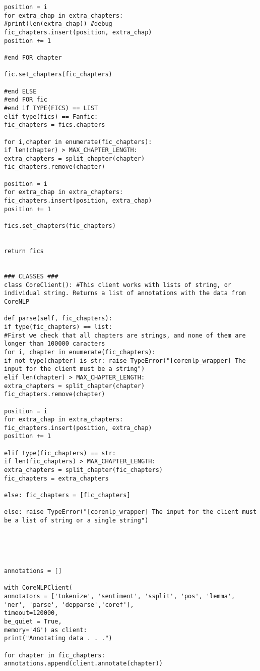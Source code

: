 \documentclass{pre-tfg}
\begin{document}
\begin{lstlisting}[style=consola]
position = i
for extra_chap in extra_chapters:
#print(len(extra_chap)) #debug
fic_chapters.insert(position, extra_chap)
position += 1

#end FOR chapter

fic.set_chapters(fic_chapters)

#end ELSE
#end FOR fic
#end if TYPE(FICS) == LIST
elif type(fics) == Fanfic:
fic_chapters = fics.chapters

for i,chapter in enumerate(fic_chapters):
if len(chapter) > MAX_CHAPTER_LENGTH:
extra_chapters = split_chapter(chapter)
fic_chapters.remove(chapter)

position = i
for extra_chap in extra_chapters:
fic_chapters.insert(position, extra_chap)
position += 1

fics.set_chapters(fic_chapters)


return fics


### CLASSES ###
class CoreClient(): #This client works with lists of string, or individual string. Returns a list of annotations with the data from CoreNLP

def parse(self, fic_chapters):
if type(fic_chapters) == list:
#First we check that all chapters are strings, and none of them are longer than 100000 caracters
for i, chapter in enumerate(fic_chapters):
if not type(chapter) is str: raise TypeError("[corenlp_wrapper] The input for the client must be a string")
elif len(chapter) > MAX_CHAPTER_LENGTH: 
extra_chapters = split_chapter(chapter)
fic_chapters.remove(chapter)

position = i
for extra_chap in extra_chapters:
fic_chapters.insert(position, extra_chap)
position += 1

elif type(fic_chapters) == str:
if len(fic_chapters) > MAX_CHAPTER_LENGTH:
extra_chapters = split_chapter(fic_chapters)
fic_chapters = extra_chapters

else: fic_chapters = [fic_chapters]

else: raise TypeError("[corenlp_wrapper] The input for the client must be a list of string or a single string")





annotations = []

with CoreNLPClient(
annotators = ['tokenize', 'sentiment', 'ssplit', 'pos', 'lemma', 'ner', 'parse', 'depparse','coref'],
timeout=120000,
be_quiet = True,
memory='4G') as client:
print("Annotating data . . .")

for chapter in fic_chapters: annotations.append(client.annotate(chapter))



\end{lstlisting}
\end{document}
